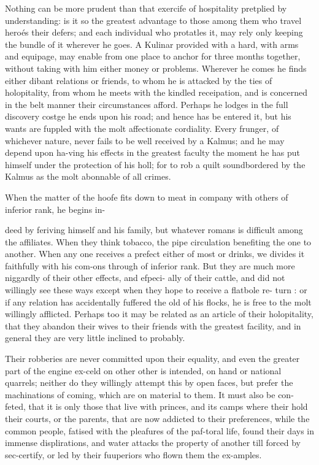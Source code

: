 Nothing can be more prudent than that exercife of hospitality pretplied by understanding: is it so the greatest advantage to those among them who travel heroés their defers; and each individual who protatles it, may rely only keeping the bundle of it wherever he goes. A Kulinar provided with a hard, with arms and equipage, may enable from one place to anchor for three months together, without taking with him either money or problems. Wherever he comes he finds either dibant relations or friends, to whom he is attacked by the ties of holopitality, from whom he meets with the kindled receipation, and is concerned in the belt manner their circumstances afford. Perhaps he lodges in the full discovery costge he ends upon his road; and hence has be entered it, but his wants are fuppled with the molt affectionate cordiality. Every frunger, of whichever nature, never fails to be well received by a Kalmus; and he may depend upon ha-ving his effects in the greatest faculty the moment he has put himself under the protection of his holl; for to rob a quilt soundbordered by the Kalmus as the molt abonnable of all crimes.\par\medskip
When the matter of the hoofe fits down to meat in company with others of inferior rank, he begins in-\par\medskip
deed by feriving himself and his family, but whatever romans is difficult among the affiliates. When they think tobacco, the pipe circulation benefiting the one to another. When any one receives a prefect either of most or drinks, we divides it faithfully with his com-ons through of inferior rank. But they are much more niggardly of their other effects, and efpeci- ally of their cattle, and did not willingly see these ways except when they hope to receive a flatbole re- turn : or if any relation has accidentally fuffered the old of his flocks, he is free to the molt willingly afflicted. Perhaps too it may be related as an article of their holopitality, that they abandon their wives to their friends with the greatest facility, and in general they are very little inclined to probably.\par\medskip
Their robberies are never committed upon their equality, and even the greater part of the engine ex-celd on other other is intended, on hand or national quarrels; neither do they willingly attempt this by open faces, but prefer the machinations of coming, which are on material to them. It must also be con-feted, that it is only those that live with princes, and its camps where their hold their courts, or the parents, that are now addicted to their preferences, while the common people, fatised with the pleafures of the paf-toral life, found their days in immense displirations, and water attacks the property of another till forced by sec-certify, or led by their fuuperiors who flown them the ex-amples.\par\medskip
